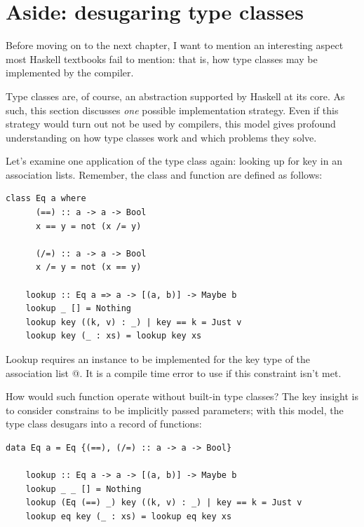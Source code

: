 \documentclass[UdineBachThesis,american,11pt]{PhdThesis}
\begin{document}
  \section{Aside: desugaring type classes}

  Before moving on to the next chapter, I want to mention an interesting aspect
  most Haskell textbooks fail to mention: that is, how type classes may be
  implemented by the compiler.

  Type classes are, of course, an abstraction supported by Haskell at its core.
  As such, this section discusses \emph{one} possible implementation strategy.
  Even if this strategy would turn out not be used by compilers, this model
  gives profound understanding on how type classes work and which problems they
  solve.

  Let's examine one application of the \lstinline@Eq@ type class again: looking
  up for key in an association lists. Remember, the \lstinline@Eq@ class and
  \lstinline@lookup@ function are defined as follows:

  \begin{lstlisting}[gobble=4,basicstyle=\ttfamily\small]
    class Eq a where
      (==) :: a -> a -> Bool
      x == y = not (x /= y)

      (/=) :: a -> a -> Bool
      x /= y = not (x == y)

    lookup :: Eq a => a -> [(a, b)] -> Maybe b
    lookup _ [] = Nothing
    lookup key ((k, v) : _) | key == k = Just v
    lookup key (_ : xs) = lookup key xs
  \end{lstlisting}

  Lookup requires an \lstinline@Eq@ instance to be implemented for the key type
  \lstinline@a@ of the association list \lstinline@[(a, b)]@. It is a compile
  time error to use \lstinline@lookup@ if this constraint isn't met.

  How would such function operate without built-in type classes? The key insight
  is to consider constrains to be implicitly passed parameters; with this model,
  the \lstinline@Eq@ type class desugars into a record of functions:

  \begin{lstlisting}[gobble=4,basicstyle=\ttfamily\small]
    data Eq a = Eq {(==), (/=) :: a -> a -> Bool}

    lookup :: Eq a -> a -> [(a, b)] -> Maybe b
    lookup _ _ [] = Nothing
    lookup (Eq (==) _) key ((k, v) : _) | key == k = Just v
    lookup eq key (_ : xs) = lookup eq key xs
  \end{lstlisting}
\end{document}
